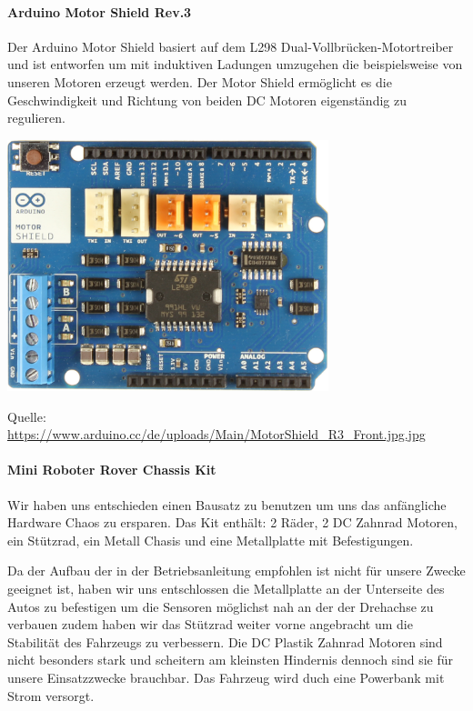 \documentclass[12pt]{article}
\newcommand*{\quelle}{%
  \footnotesize Quelle: 
}
\begin{document}
\paragraph{Arduino Motor Shield Rev.3} Der Arduino Motor Shield basiert auf dem L298 Dual-Vollbrücken-Motortreiber und ist entworfen um mit induktiven Ladungen umzugehen die beispielsweise von unseren Motoren erzeugt werden. Der Motor Shield ermöglicht es die Geschwindigkeit und Richtung von beiden DC Motoren eigenständig zu regulieren.

\vspace{0.5cm}
\includegraphics[width=0.7\textwidth]{MotorShield_Front.jpg}\par
\quelle\url{https://www.arduino.cc/de/uploads/Main/MotorShield_R3_Front.jpg.jpg}

\paragraph{Mini Roboter Rover Chassis Kit} Wir haben uns entschieden einen Bausatz zu benutzen um uns das anfängliche Hardware Chaos zu ersparen. Das Kit enthält: 2 Räder, 2 DC Zahnrad Motoren, ein Stützrad, ein Metall Chasis und eine Metallplatte mit Befestigungen.

Da der Aufbau der in der Betriebsanleitung empfohlen ist nicht für unsere Zwecke geeignet ist, haben wir uns entschlossen die Metallplatte an der Unterseite des Autos zu befestigen um die Sensoren möglichst nah an der der Drehachse zu verbauen zudem haben wir das Stützrad weiter vorne angebracht um die Stabilität des Fahrzeugs zu verbessern. Die DC Plastik Zahnrad Motoren sind nicht besonders stark und scheitern am kleinsten Hindernis dennoch sind sie für unsere Einsatzzwecke brauchbar. Das Fahrzeug wird duch eine Powerbank mit Strom versorgt.
\vspace{0.5cm}
\end{document}
